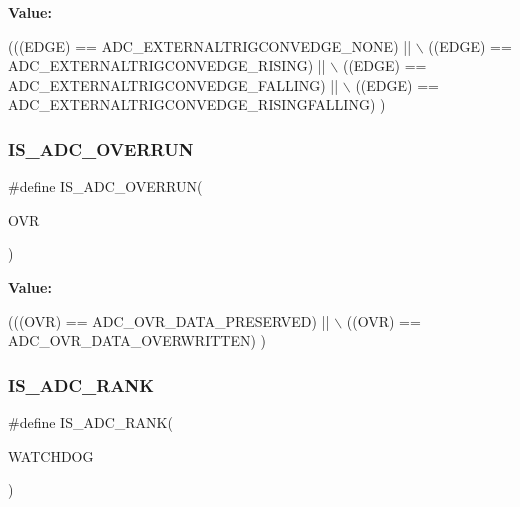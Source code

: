 {\bfseries Value\+:}
\begin{DoxyCode}
(((EDGE) == ADC\_EXTERNALTRIGCONVEDGE\_NONE)         || \(\backslash\)
                                   ((EDGE) == ADC\_EXTERNALTRIGCONVEDGE\_RISING)       || \(\backslash\)
                                   ((EDGE) == ADC\_EXTERNALTRIGCONVEDGE\_FALLING)      || \(\backslash\)
                                   ((EDGE) == ADC\_EXTERNALTRIGCONVEDGE\_RISINGFALLING)  )
\end{DoxyCode}
\mbox{\label{group___a_d_c___private___macros_ga99e2ba194894e94fd851e3852dbbc4eb}} 
\subsubsection{\texorpdfstring{I\+S\+\_\+\+A\+D\+C\+\_\+\+O\+V\+E\+R\+R\+UN}{IS\_ADC\_OVERRUN}}
{\footnotesize\ttfamily \#define I\+S\+\_\+\+A\+D\+C\+\_\+\+O\+V\+E\+R\+R\+UN(\begin{DoxyParamCaption}\item[{}]{O\+VR }\end{DoxyParamCaption})}

{\bfseries Value\+:}
\begin{DoxyCode}
(((OVR) == ADC\_OVR\_DATA\_PRESERVED)  || \(\backslash\)
                             ((OVR) == ADC\_OVR\_DATA\_OVERWRITTEN)  )
\end{DoxyCode}
\mbox{\label{group___a_d_c___private___macros_gaa961c34cbbbfe877ec9ab52a12dcf79b}} 
\subsubsection{\texorpdfstring{I\+S\+\_\+\+A\+D\+C\+\_\+\+R\+A\+NK}{IS\_ADC\_RANK}}
{\footnotesize\ttfamily \#define I\+S\+\_\+\+A\+D\+C\+\_\+\+R\+A\+NK(\begin{DoxyParamCaption}\item[{}]{W\+A\+T\+C\+H\+D\+OG }\end{DoxyParamCaption})}

